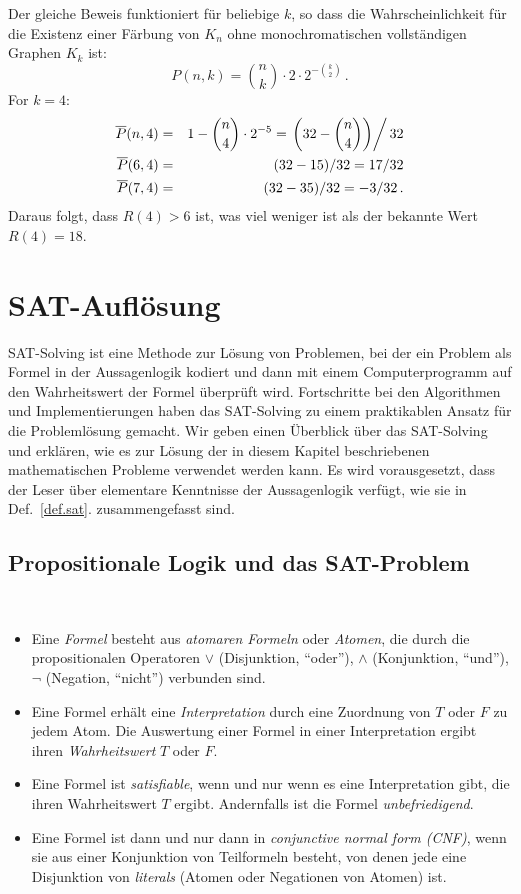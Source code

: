 Der gleiche Beweis funktioniert für beliebige $k$, so dass die Wahrscheinlichkeit für die Existenz einer Färbung von $K_n$ ohne monochromatischen vollständigen Graphen $K_k$ ist:
\[
P(n,k)=\binom{n}{k}\cdot 2\cdot 2^{-\binom{k}{2}}\,.
\]
For $k=4$:
\begin{eqnarray*}
\overline{P}(n,4)&=&1-\binom{n}{4}\cdot 2^{-5}=\left.\left(32-\binom{n}{4}\right)\right/32\\
\overline{P}(6,4)&=&(32-15)/32=17/32\\
\overline{P}(7,4)&=&(32-35)/32=-3/32\,.
\end{eqnarray*}
Daraus folgt, dass $R(4)>6$ ist, was viel weniger ist als der bekannte Wert $R(4)=18$.


\section{SAT-Auflösung}\label{s.sat}

SAT-Solving ist eine Methode zur Lösung von Problemen, bei der ein Problem als Formel in der Aussagenlogik kodiert und dann mit einem Computerprogramm auf den Wahrheitswert der Formel überprüft wird. Fortschritte bei den Algorithmen und Implementierungen haben das SAT-Solving zu einem praktikablen Ansatz für die Problemlösung gemacht. Wir geben einen Überblick über das SAT-Solving und erklären, wie es zur Lösung der in diesem Kapitel beschriebenen mathematischen Probleme verwendet werden kann. Es wird vorausgesetzt, dass der Leser über elementare Kenntnisse der Aussagenlogik verfügt, wie sie in Def.~\ref{def.sat}. zusammengefasst sind.

\subsection{Propositionale Logik und das SAT-Problem}

\begin{definition}\label{def.sat}\mbox{}\\
\begin{itemize}
\item Eine \emph{Formel} besteht aus \emph{atomaren Formeln} oder \emph{Atomen}, die durch die propositionalen Operatoren $\vee$ (Disjunktion, ``oder''), $\wedge$ (Konjunktion, ``und''), $\neg$ (Negation, ``nicht'') verbunden sind.
\item Eine Formel erhält eine \emph{Interpretation} durch eine Zuordnung von $T$ oder $F$ zu jedem Atom. Die Auswertung einer Formel in einer Interpretation ergibt ihren \emph{Wahrheitswert} $T$ oder $F$. 
\item Eine Formel ist \emph{satisfiable}, wenn und nur wenn es eine Interpretation gibt, die ihren Wahrheitswert $T$ ergibt. Andernfalls ist die Formel \emph{unbefriedigend}.
\item Eine Formel ist dann und nur dann in \emph{conjunctive normal form (CNF)}, wenn sie aus einer Konjunktion von Teilformeln besteht, von denen jede eine Disjunktion von \emph{literals} (Atomen oder Negationen von Atomen) ist.
\end{itemize}
\end{definition}

